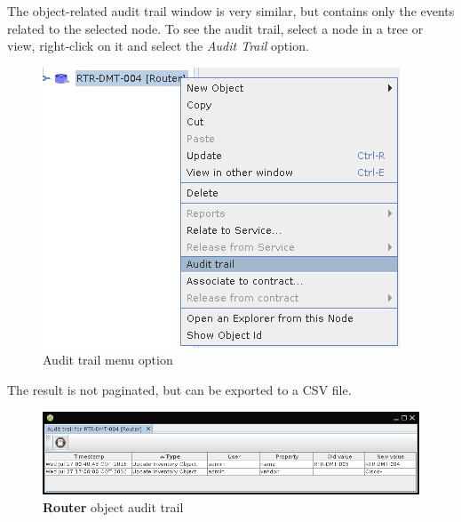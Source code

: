 \documentclass[a4paper]{article}
\begin{document}
	The object-related audit trail window is very similar, but contains only the events related to the selected node. To see the audit trail, select a node in a tree or view, right-click on it and select the \textit{Audit Trail} option.
		\begin{figure}[h!]
			\centering
			\includegraphics[width=0.5\linewidth]{img/audit_trail_menu_option.png}
			\caption{Audit trail menu option}
			\label{fig:audit_trail_menu_option}
		\end{figure}
		\newpage
		The result is not paginated, but can be exported to a CSV file.
		\begin{figure}[h!]
			\centering
			\includegraphics[width=\linewidth]{img/audit_trail_object_related_events.png}
			\caption{\textbf{Router} object audit trail}
			\label{fig:audit_trail_object_related_events}
		\end{figure}
	\newpage
\end{document}

